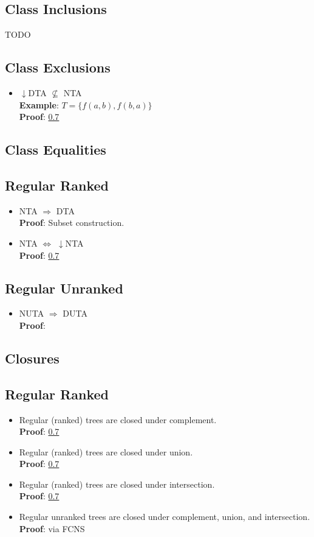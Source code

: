 \documentclass{article}
\begin{document}
\subsection{Class Inclusions}
TODO

\subsection{Class Exclusions}
\begin{itemize}
	\item $\downarrow$DTA $\not\subseteq$ NTA \\
		\textbf{Example}: $T = \{ f(a, b), f(b, a) \}$ \\
		\textbf{Proof}: \ref{} %
\end{itemize}

\subsection{Class Equalities}
\subsection{Regular Ranked}
\begin{itemize}
	\item NTA $\Rightarrow$ DTA \\
		\textbf{Proof}: Subset construction.
	\item NTA $\Leftrightarrow$ $\downarrow$NTA \\
		\textbf{Proof}: \ref{} %
\end{itemize}

\subsection{Regular Unranked}
\begin{itemize}
	\item NUTA $\Rightarrow$ DUTA \\
		\textbf{Proof}: %
\end{itemize}

\subsection{Closures}
\subsection{Regular Ranked}
\begin{itemize}
	\item Regular (ranked) trees are closed under complement. \\
		\textbf{Proof}: \ref{} %
	\item Regular (ranked) trees are closed under union. \\
		\textbf{Proof}: \ref{} %
	\item Regular (ranked) trees are closed under intersection. \\
		\textbf{Proof}: \ref{} %
	\item Regular unranked trees are closed under complement, union, and intersection. \\
		\textbf{Proof}: via FCNS 
\end{itemize}
\end{document}
